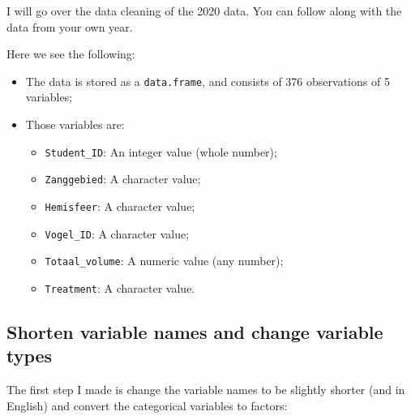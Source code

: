 \documentclass[
]{book}
\providecommand{\tightlist}{%
  \setlength{\itemsep}{0pt}\setlength{\parskip}{0pt}}
\begin{document}
I will go over the data cleaning of the 2020 data. You can follow along with the data from your own year.

Here we see the following:

\begin{itemize}
\tightlist
\item
  The data is stored as a \texttt{data.frame}, and consists of 376 observations of 5 variables;
\item
  Those variables are:

  \begin{itemize}
  \tightlist
  \item
    \texttt{Student\_ID}: An integer value (whole number);
  \item
    \texttt{Zanggebied}: A character value;
  \item
    \texttt{Hemisfeer}: A character value;
  \item
    \texttt{Vogel\_ID}: A character value;
  \item
    \texttt{Totaal\_volume}: A numeric value (any number);
  \item
    \texttt{Treatment}: A character value.
  \end{itemize}
\end{itemize}

\hypertarget{shorten-variable-names-and-change-variable-types}{%
\subsection{Shorten variable names and change variable types}\label{shorten-variable-names-and-change-variable-types}}

The first step I made is change the variable names to be slightly shorter (and in English) and convert the categorical variables to factors:
\end{document}
